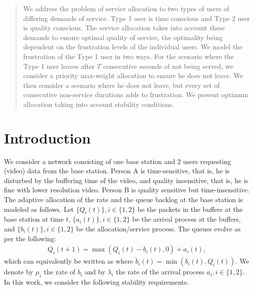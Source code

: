 \documentclass[10pt,a4paper]{article}
\begin{document}
\maketitle
\thispagestyle{empty}



\begin{abstract}
We address the problem of service allocation to two types of users of differing demands of service. Type 1 user is time conscious and Type 2 user is quality conscious. The service allocation takes into account these demands to ensure optimal quality of service, the optimality being dependent on the frustration levels of the individual users. We model the frustration of the Type 1 user in two ways. For the scenario where the Type 1 user leaves after $T$ consecutive seconds of not being served, we consider a priority max-weight allocation to ensure he does not leave. We then consider a scenario where he does not leave, but every set of consecutive non-service durations adds to frustration. We present optimum allocation taking into account stability conditions.
\end{abstract}



\section{Introduction}
We consider a network consisting of one base station and $2$ users requesting (video) data from the base station. Person A is time-sensitive, that is, he is disturbed by the buffering time of the video, and quality insensitive, that is, he is fine with lower resolution video. Person B is quality sensitive but time-insensitive. The adaptive allocation of the rate and the queue backlog at the base station is modeled as follows. Let $\{Q_i(t)\}, i \in \{1,2 \}$ be the packets in the buffers at the base station at time $t$, $\{a_i(t)\} , i \in \{1,2\}$ be the arrival process at the buffers, and $\{b_i(t)\}, i \in \{1,2\}$ be the allocation/service process.
The queues evolve as per the following:
\begin{align}
\label{eqn:QueueEvolution}
Q_i(t+1) = \max(Q_i(t)-b_i(t),0) + a_i(t),
\end{align}
which can equivalently be written as  where $\tilde{b}_i(t) = \min(b_i(t),Q_i(t)).$
We denote by $\mu_i$ the rate of $b_i$ and by $\lambda_i$ the rate of the arrival process $a_i, i \in\{1,2\}.$ In this work, we consider the following stability requirements. %
\end{document}
